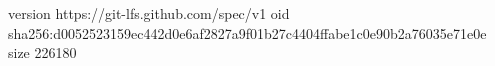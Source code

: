 version https://git-lfs.github.com/spec/v1
oid sha256:d0052523159ec442d0e6af2827a9f01b27c4404ffabe1c0e90b2a76035e71e0e
size 226180
